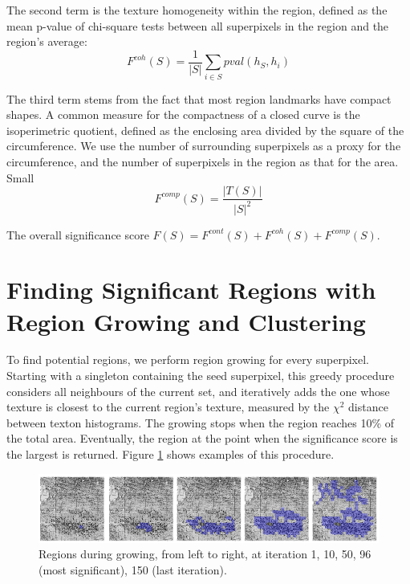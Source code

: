 \documentclass{llncs}
\begin{document}
The second term is the texture homogeneity within the region, defined as the mean p-value of chi-square tests between all superpixels in the region and the region's average:
$$F^{coh}(S) = \frac{1}{|S|} \sum_{i\in S} pval(h_S, h_i)$$

The third term stems from the fact that most region landmarks have compact shapes. A common measure for the compactness of a closed curve is the isoperimetric quotient, defined as the enclosing area divided by the square of the circumference. We use the number of surrounding superpixels as a proxy for the circumference, and the number of superpixels in the region as that for the area. Small 
$$F^{comp}(S) = \frac{|T(S)|}{|S|^2}$$

The overall significance score $F(S) = F^{cont}(S) + F^{coh}(S) + F^{comp}(S)$.


\section{Finding Significant Regions with Region Growing and Clustering}

To find potential regions, we perform region growing for every superpixel. Starting with a singleton containing the seed superpixel, this greedy procedure considers all neighbours of the current set, and iteratively adds the one whose texture is closest to the current region's texture, measured by the $\chi^2$ distance between texton histograms. The growing stops when the region reaches 10\% of the total area. Eventually, the region at the point when the significance score is the largest is returned. Figure \ref{fig:RegionGrowing} shows examples of this procedure.
\begin{figure}
	\includegraphics[width=\textwidth]{../figures/RegionGrowingPicsOnly.png}
	\caption{Regions during growing, from left to right, at iteration 1, 10, 50, 96 (most significant), 150 (last iteration).} %
	\label{fig:RegionGrowing}
\end{figure}

\end{document}
